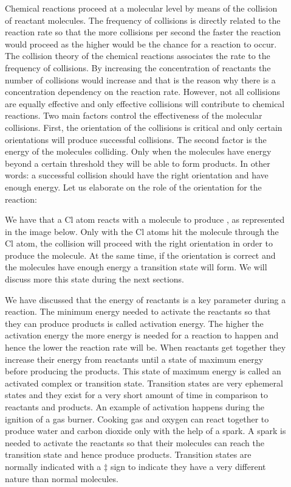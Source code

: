 \documentclass[main.tex]{subfiles}
\begin{document}
\begin{description}
\item[] 
Chemical reactions proceed at a molecular level by means of the collision of reactant molecules. The frequency of collisions is directly related to the reaction rate so that the more collisions per second the faster the reaction would proceed as the higher would be the chance for a reaction to occur. The collision theory of the chemical reactions associates the rate to the frequency of collisions. By increasing the concentration of reactants the number of collisions would increase and that is the reason why there is a concentration dependency on the reaction rate. However, not all collisions are equally effective and only effective collisions will contribute to chemical reactions. Two main factors control the effectiveness of the molecular collisions. First, the orientation of the collisions is critical and only certain orientations will produce successful collisions. The second factor is the energy of the molecules colliding. Only when the molecules have energy beyond a certain threshold they will be able to form products. In other words: a successful collision should have the right orientation and have enough energy. Let us elaborate on the role of the orientation for the reaction:
\begin{center}\end{center}
We have that a Cl atom reacts with a  molecule to produce , as represented in the image below. Only with the Cl atoms hit the  molecule through the Cl atom, the collision will proceed with the right orientation in order to produce the  molecule. At the same time, if the orientation is correct and the molecules have enough energy a transition state will form. We will discuss more this state during the next sections. 



 

\item[] 
We have discussed that the energy of reactants is a key parameter during a reaction. The minimum energy needed to activate the reactants so that they can produce products is called activation energy. The higher the activation energy the more energy is needed for a reaction to happen and hence the lower the reaction rate will be. When reactants get together they increase their energy from reactants until a state of maximum energy before producing the products. This state of maximum energy is called an activated complex or transition state. Transition states are very ephemeral states and they exist for a very short amount of time in comparison to reactants and products. An example of activation happens during the ignition of a gas burner. Cooking gas and oxygen can react together to produce water and carbon dioxide only with the help of a spark. A spark is needed to activate the reactants so that their molecules can reach the transition state and hence produce products. Transition states are normally indicated with a $\ddag$  sign to indicate they have a very different nature than normal molecules.


\end{description}
\end{document}
